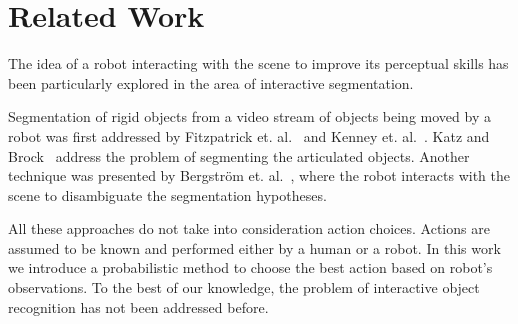 \section{Related Work}







    The idea of a robot interacting with the scene to improve its perceptual skills has been particularly explored in the area of interactive segmentation.

    Segmentation of rigid objects from a video stream of objects being moved by a robot was first addressed by Fitzpatrick et. al.~\cite{fitzpatrick_active_vision} and Kenney et. al.~\cite{KenneyInteractive}. Katz and Brock~\cite{Katz-WS-MM-ICRA2011} address the problem of segmenting the articulated objects. Another technique was presented by Bergstr\"{o}m et. al.~\cite{bergstrom11icvs}, where the robot interacts with the scene to disambiguate the segmentation hypotheses.


    All these approaches do not take into consideration action choices. Actions are assumed to be known and performed either by a human or a robot. In this work we introduce a probabilistic method to choose the best action based on robot's observations. To the best of our knowledge, the problem of interactive object recognition has not been addressed before. 
